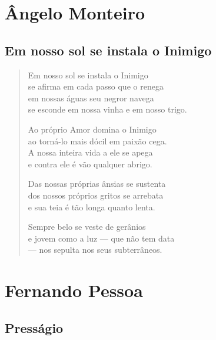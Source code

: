 \documentclass[10pt,a5paper,oneside]{book}
\begin{document}
\part{Ângelo Monteiro}

\chapter{Em nosso sol se instala o Inimigo}

\begin{verse}
Em nosso sol se instala o Inimigo\\
se afirma em cada passo que o renega\\
em nossas águas seu negror navega\\
se esconde em nossa vinha e em nosso trigo.

Ao próprio Amor domina o Inimigo\\
ao torná-lo mais dócil em paixão cega.\\
A nossa inteira vida a ele se apega\\
e contra ele é vão qualquer abrigo.

Das nossas próprias ânsias se sustenta\\
dos nossos próprios gritos se arrebata\\
e sua teia é tão longa quanto lenta.

Sempre belo se veste de gerânios\\
e jovem como a luz --- que não tem data\\
--- nos sepulta nos seus subterrâneos.
\end{verse}

\part{Fernando Pessoa}

\chapter{Presságio}
\end{document}
